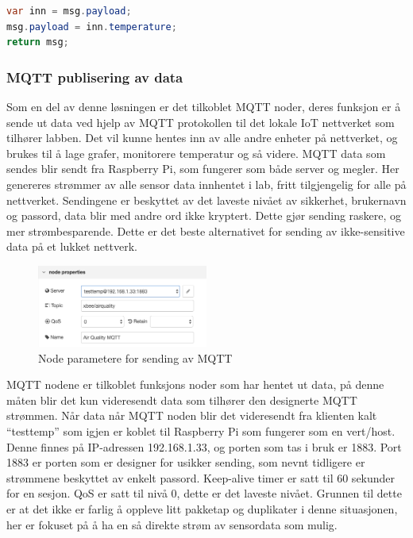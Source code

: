 \documentclass{article}
\begin{document}
\begin{lstlisting}[language=Java, caption=Funksjon for innhenting av temperatur data fra RPi Sense Hat]
var inn = msg.payload;
msg.payload = inn.temperature;
return msg;
\end{lstlisting}

\subsubsection{MQTT publisering av data}
Som en del av denne løsningen er det tilkoblet MQTT noder, deres funksjon er å sende ut data ved hjelp av MQTT protokollen til det lokale IoT nettverket som tilhører labben. Det vil kunne hentes inn av alle andre enheter på nettverket, og brukes til å lage grafer, monitorere temperatur og så videre. MQTT data som sendes blir sendt fra Raspberry Pi, som fungerer som både server og megler. Her genereres strømmer av alle sensor data innhentet i lab, fritt tilgjengelig for alle på nettverket. Sendingene er beskyttet av det laveste nivået av sikkerhet, brukernavn og passord, data blir med andre ord ikke kryptert. Dette gjør sending raskere, og mer strømbesparende. Dette er det beste alternativet for sending av ikke-sensitive data på et lukket nettverk.
\linebreak 
\begin{figure}[!ht]
  \centering
      \includegraphics[width=0.5\textwidth]{xbeemqttkonfig}
  \caption{Node parametere for sending av MQTT}
\end{figure}

MQTT nodene er tilkoblet funksjons noder som har hentet ut data, på denne måten blir det kun videresendt data som tilhører den designerte MQTT strømmen. Når data når MQTT noden blir det videresendt fra klienten kalt “testtemp” som igjen er koblet til Raspberry Pi som fungerer som en vert/host. Denne finnes på IP-adressen 192.168.1.33, og porten som tas i bruk er 1883. Port 1883 er porten som er designer for usikker sending, som nevnt tidligere er strømmene beskyttet av enkelt passord. Keep-alive timer er satt til 60 sekunder for en sesjon. QoS er satt til nivå 0, dette er det laveste nivået. Grunnen til dette er at det ikke er farlig å oppleve litt pakketap og duplikater i denne situasjonen, her er fokuset på å ha en så direkte strøm av sensordata som mulig. 
\end{document}
